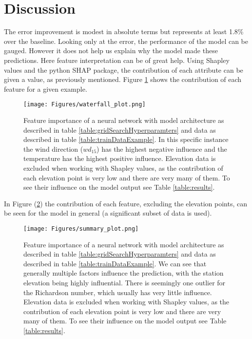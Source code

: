 \section{Discussion}
The error improvement is modest in absolute terms but represents at least 1.8\% over the baseline. Looking only at the error, the performance of the model can be gauged. However it does not help us explain why the model made these predictions. Here feature interpretation can be of great help. Using Shapley values and the python SHAP package, the contribution of each attribute can be given a value, as previously mentioned. Figure \ref{fig:ShapleyWaterfall} shows the contribution of each feature for a given example.

\begin{figure}[h]
    \centering
    \caption[Feature importance for a single observation of a neural network.]{Feature importance of a neural network with model architecture as described in table \ref{table:gridSearchHyperparamters} and data as described in table \ref{table:trainDataExample}. In this specific instance the wind direction ($wd_15$) has the highest negative influence and the temperature has the highest positive influence. Elevation data is excluded when working with Shapley values, as the contribution of each elevation point is very low and there are very many of them. To see their influence on the model output see Table \ref{table:results}.}
    \texttt{[image: Figures/waterfall\_plot.png]}
    \label{fig:ShapleyWaterfall}
\end{figure}

In Figure (\ref{fig:ShapleySummary}) the contribution of each feature, excluding the elevation points, can be seen for the model in general (a significant subset of data is used).

\begin{figure}
    \centering
    \caption[Feature importance of a neural network.]{Feature importance of a neural network with model architecture as described in table \ref{table:gridSearchHyperparamters} and data as described in table \ref{table:trainDataExample}. We can see that generally multiple factors influence the prediction, with the station elevation being highly influential. There is seemingly one outlier for the Richardson number, which usually has very little influence. Elevation data is excluded when working with Shapley values, as the contribution of each elevation point is very low and there are very many of them. To see their influence on the model output see Table \ref{table:results}.}
    \texttt{[image: Figures/summary\_plot.png]}
    \label{fig:ShapleySummary}
\end{figure}